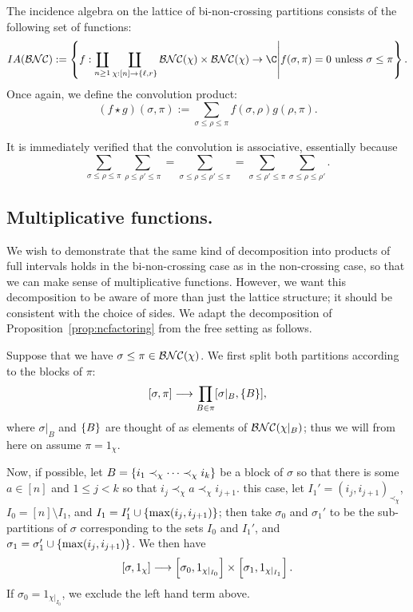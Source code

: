 \begin{definition}
	The incidence algebra on the lattice of bi-non-crossing partitions consists of the following set of functions:
	$$IA(\BNC) := \set{f : \coprod_{n\geq1}\coprod_{\chi : [n]\to\slr} \BNC(\chi)\times\BNC(\chi) \to \C \middle| f(\sigma, \pi) = 0 \text{ unless } \sigma \leq \pi}.$$ 
	Once again, we define the convolution product:
	$$(f\star g)(\sigma, \pi) := \sum_{\sigma \leq \rho \leq \pi} f(\sigma, \rho)g(\rho, \pi).$$
\end{definition}
It is immediately verified that the convolution is associative, essentially because
$$\sum_{\sigma \leq \rho \leq \pi}\sum_{\rho \leq \rho' \leq \pi} = \sum_{\sigma\leq\rho\leq\rho'\leq\pi} = \sum_{\sigma\leq\rho'\leq\pi}\sum_{\sigma\leq\rho\leq\rho'}.$$


\subsection{Multiplicative functions.}
We wish to demonstrate that the same kind of decomposition into products of full intervals holds in the bi-non-crossing case as in the non-crossing case, so that we can make sense of multiplicative functions.
However, we want this decomposition to be aware of more than just the lattice structure; it should be consistent with the choice of sides.
We adapt the decomposition of Proposition~\ref{prop:ncfactoring} from the free setting as follows.

Suppose that we have $\sigma \leq \pi \in \mathcal{BNC}(\chi)$.
We first split both partitions according to the blocks of $\pi$:
$$[\sigma, \pi] \longrightarrow \prod_{B \in \pi} [\sigma|_B, \left\{B\right\}],$$
where $\sigma|_B$ and $\left\{B\right\}$ are thought of as elements of $\mathcal{BNC}(\chi|_B)$; thus we will from here on assume $\pi = 1_\chi$.

Now, if possible, let $B = \left\{i_1 \prec_\chi \cdots \prec_\chi i_k\right\}$ be a block of $\sigma$ so that there is some $a \in [n]$ and $1 \leq j < k$ so that $i_j \prec_\chi a \prec_\chi i_{j+1}$.
 this case, let $I_1' = (i_j, i_{j+1})_{\prec_\chi}$, $I_0 = [n] \setminus I_1$, and $I_1 = I_1' \cup \left\{\max(i_j, i_{j+1})\right\}$; then take $\sigma_0$ and $\sigma_1'$ to be the sub-partitions of $\sigma$ corresponding to the sets $I_0$ and $I_1'$, and $\sigma_1 = \sigma_1' \cup \left\{\max(i_j, i_{j+1})\right\}$.
We then have
$$\left[\sigma, 1_\chi\right] \longrightarrow \left[\sigma_0, 1_{\chi|_{I_0}}\right] \times \left[\sigma_1, 1_{\chi|_{I_1}}\right].$$
If $\sigma_0 = 1_{\chi|_{I_0}}$, we exclude the left hand term above.

